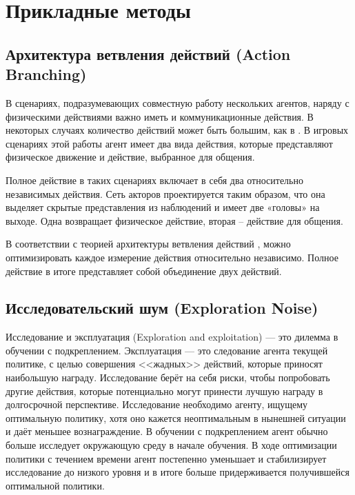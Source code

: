 \section{Прикладные методы}

\subsection{Архитектура ветвления действий (Action Branching)}

В сценариях, подразумевающих совместную работу нескольких агентов, наряду с физическими действиями важно иметь и коммуникационные действия. В некоторых случаях количество действий может быть большим, как в \cite{tavakoli2017action}. В игровых сценариях этой работы агент имеет два вида действия, которые представляют физическое движение и действие, выбранное для общения.

Полное действие в таких сценариях включает в себя два относительно независимых действия. Сеть акторов проектируется таким образом, что она выделяет скрытые представления из наблюдений и имеет две «головы» на выходе. Одна возвращает физическое действие, вторая – действие для общения.

В соответствии с теорией архитектуры ветвления действий \cite{tavakoli2017action}, можно оптимизировать каждое измерение действия относительно независимо. Полное действие в итоге представляет собой объединение двух действий.

\subsection{Исследовательский шум (Exploration Noise)}

Исследование и эксплуатация (Exploration and exploitation) — это дилемма в обучении с подкреплением. Эксплуатация — это следование агента текущей политике, с целью совершения <<жадных>> действий, которые приносят наибольшую награду. Исследование берёт на себя риски, чтобы попробовать другие действия, которые потенциально могут принести лучшую награду в долгосрочной перспективе. Исследование необходимо агенту, ищущему оптимальную политику, хотя оно кажется неоптимальным в нынешней ситуации и даёт меньшее вознаграждение. В обучении с подкреплением агент обычно больше исследует окружающую среду в начале обучения. В ходе оптимизации политики с течением времени агент постепенно уменьшает и стабилизирует исследование до низкого уровня и в итоге больше придерживается получившейся оптимальной политики.


